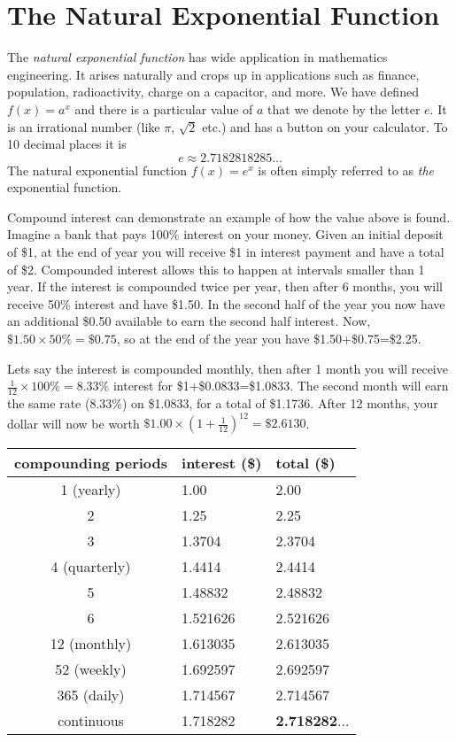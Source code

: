 \section[$e^x$]{The Natural Exponential Function}\label{sec:naturalExponential}
The \emph{natural exponential function} has wide application in mathematics engineering. It arises naturally and crops up in applications such as finance, population, radioactivity, charge on a capacitor, and more. We have defined $f (x) =a^x$ and there is a particular value of $a$ that we denote by the letter $e$. It is an irrational number (like $\pi $, $\sqrt{2}$ etc.) and has a button on your calculator. To 10 decimal places it is
\[e \approx 2.7182818285\dots\]
The natural exponential function $f (x) =e^x$ is often simply referred to as \textit{the} exponential function. 

Compound interest can demonstrate an example of  how the value above is found. Imagine a bank that pays 100\% interest on your money. Given an initial deposit of \$1, at the end of year you will receive \$1 in interest payment and have a total of \$2. Compounded interest allows this to happen at intervals smaller than 1 year. If the interest is compounded twice per year, then after 6 months, you will receive 50\% interest and have \$1.50. In the second half of the year you now have an additional \$0.50 available to earn the second half interest. Now, $\$1.50\times50\%=\$0.75$, so at the end of the year you have \$1.50+\$0.75=\$2.25.

Lets say the interest is compounded monthly, then after 1 month you will receive $\frac{1}{12}\times 100\%=8.33\%$ interest for \$1+\$0.0833=\$1.0833. The second month will earn the same rate (8.33\%) on \$1.0833, for a total of \$1.1736. After 12 months, your dollar will now be worth $\$1.00\times\left(1+\frac{1}{12}\right)^{12}=\$2.6130$. 
\begin{center}
\begin{tabular}{cll}
	\toprule
	compounding periods&interest (\$)&total (\$)\\
	\midrule
	1 (yearly)&1.00&2.00\\
	2&1.25&2.25\\
	3&1.3704 &2.3704\\
	4 (quarterly)& 1.4414 & 2.4414 \\
	5& 1.48832 & 2.48832 \\
	6& 1.521626&2.521626\\\midrule
	12 (monthly)& 1.613035&2.613035 \\\midrule
	52 (weekly)&1.692597 &2.692597\\\midrule
	365 (daily)&1.714567 &2.714567\\\midrule
	continuous& 1.718282&\textbf{2.718282$\dots$}\\
	\bottomrule
\end{tabular}
\end{center}

